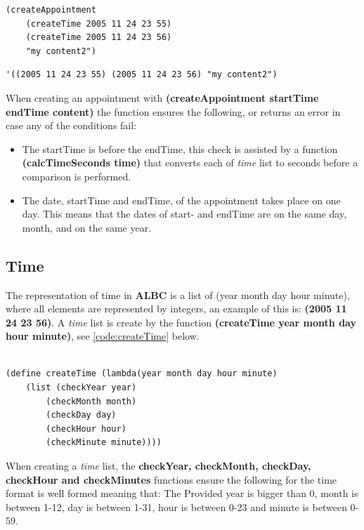 \documentclass{IOS-Book-Article}
\begin{document}
\begin{lstlisting}[frame=single, caption={Creating an appointment}, label={code:appointmentCreation}] 
(createAppointment 
	(createTime 2005 11 24 23 55)
	(createTime 2005 11 24 23 56) 
	"my content2")
\end{lstlisting}

\begin{lstlisting}[frame=single, caption={Appointment representation}, label={code:appointmentRepresentation}] 
'((2005 11 24 23 55) (2005 11 24 23 56) "my content2")
\end{lstlisting}

When creating an appointment with \textbf{(createAppointment startTime endTime content)} the function ensures the following, or returns an error in case any of the conditions fail:
\begin{itemize}
\item The startTime is before the endTime, this check is assisted by a function \textbf{(calcTimeSeconds time)} that converts each of \textit{time} list to seconds before a comparison is performed.
\item The date, startTime and endTime, of the appointment takes place on one day. This means that the dates of start- and endTime are on the same day, month, and on the same year.
\end{itemize}


\subsection{Time}
The representation of time in \textbf{ALBC} is a list of (year month day hour minute), where all elements are represented by integers, an example of this is: \textbf{(2005 11 24 23 56)}. A \textit{time} list is create by the function \textbf{(createTime year month day hour minute)}, see \autoref{code:createTime} below.

\begin{lstlisting}[frame=single, caption={Definition of (createTime year month day hour minute)}, label={code:createTime}]  % Start your code-block

(define createTime (lambda(year month day hour minute)
 	(list (checkYear year) 
 		(checkMonth month) 
 		(checkDay day) 
	 	(checkHour hour) 
	 	(checkMinute minute))))  
\end{lstlisting}

When creating a \textit{time} list, the \textbf{checkYear, checkMonth, checkDay, checkHour and checkMinutes} functions ensure the following for the time format is well formed meaning that: The Provided year is bigger than 0, month is between 1-12, day is between 1-31, hour is between 0-23 and minute is between 0-59.
\end{document}
